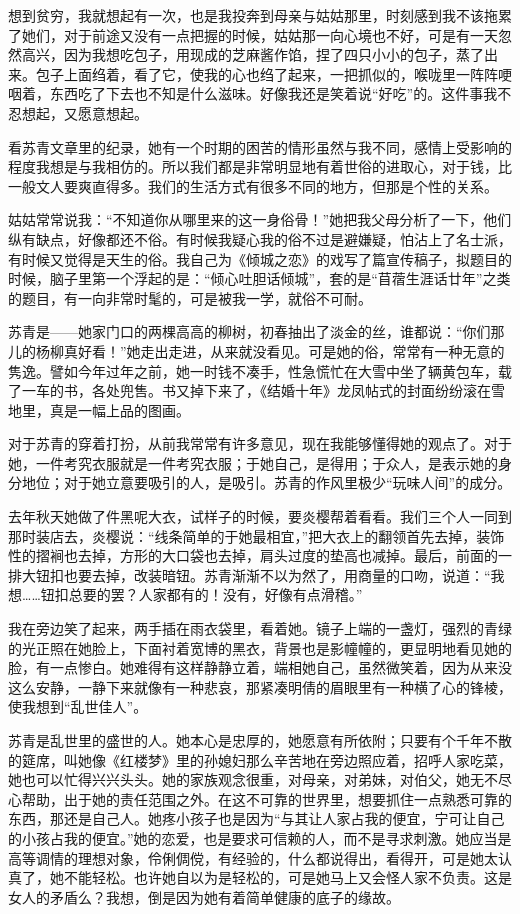 \par 想到贫穷，我就想起有一次，也是我投奔到母亲与姑姑那里，时刻感到我不该拖累了她们，对于前途又没有一点把握的时候，姑姑那一向心境也不好，可是有一天忽然高兴，因为我想吃包子，用现成的芝麻酱作馅，捏了四只小小的包子，蒸了出来。包子上面绉着，看了它，使我的心也绉了起来，一把抓似的，喉咙里一阵阵哽咽着，东西吃了下去也不知是什么滋味。好像我还是笑着说“好吃”的。这件事我不忍想起，又愿意想起。
\par 看苏青文章里的纪录，她有一个时期的困苦的情形虽然与我不同，感情上受影响的程度我想是与我相仿的。所以我们都是非常明显地有着世俗的进取心，对于钱，比一般文人要爽直得多。我们的生活方式有很多不同的地方，但那是个性的关系。
\par 姑姑常常说我：“不知道你从哪里来的这一身俗骨！”她把我父母分析了一下，他们纵有缺点，好像都还不俗。有时候我疑心我的俗不过是避嫌疑，怕沾上了名士派，有时候又觉得是天生的俗。我自己为《倾城之恋》的戏写了篇宣传稿子，拟题目的时候，脑子里第一个浮起的是：“倾心吐胆话倾城”，套的是“苜蓿生涯话廿年”之类的题目，有一向非常时髦的，可是被我一学，就俗不可耐。
\par 苏青是——她家门口的两棵高高的柳树，初春抽出了淡金的丝，谁都说：“你们那儿的杨柳真好看！”她走出走进，从来就没看见。可是她的俗，常常有一种无意的隽逸。譬如今年过年之前，她一时钱不凑手，性急慌忙在大雪中坐了辆黄包车，载了一车的书，各处兜售。书又掉下来了，《结婚十年》龙凤帖式的封面纷纷滚在雪地里，真是一幅上品的图画。
\par 对于苏青的穿着打扮，从前我常常有许多意见，现在我能够懂得她的观点了。对于她，一件考究衣服就是一件考究衣服；于她自己，是得用；于众人，是表示她的身分地位；对于她立意要吸引的人，是吸引。苏青的作风里极少“玩味人间”的成分。
\par 去年秋天她做了件黑呢大衣，试样子的时候，要炎樱帮着看看。我们三个人一同到那时装店去，炎樱说：“线条简单的于她最相宜，”把大衣上的翻领首先去掉，装饰性的摺裥也去掉，方形的大口袋也去掉，肩头过度的垫高也减掉。最后，前面的一排大钮扣也要去掉，改装暗钮。苏青渐渐不以为然了，用商量的口吻，说道：“我想……钮扣总要的罢？人家都有的！没有，好像有点滑稽。”
\par 我在旁边笑了起来，两手插在雨衣袋里，看着她。镜子上端的一盏灯，强烈的青绿的光正照在她脸上，下面衬着宽博的黑衣，背景也是影幢幢的，更显明地看见她的脸，有一点惨白。她难得有这样静静立着，端相她自己，虽然微笑着，因为从来没这么安静，一静下来就像有一种悲哀，那紧凑明倩的眉眼里有一种横了心的锋棱，使我想到“乱世佳人”。
\par 苏青是乱世里的盛世的人。她本心是忠厚的，她愿意有所依附；只要有个千年不散的筵席，叫她像《红楼梦》里的孙媳妇那么辛苦地在旁边照应着，招呼人家吃菜，她也可以忙得兴兴头头。她的家族观念很重，对母亲，对弟妹，对伯父，她无不尽心帮助，出于她的责任范围之外。在这不可靠的世界里，想要抓住一点熟悉可靠的东西，那还是自己人。她疼小孩子也是因为“与其让人家占我的便宜，宁可让自己的小孩占我的便宜。”她的恋爱，也是要求可信赖的人，而不是寻求刺激。她应当是高等调情的理想对象，伶俐倜傥，有经验的，什么都说得出，看得开，可是她太认真了，她不能轻松。也许她自以为是轻松的，可是她马上又会怪人家不负责。这是女人的矛盾么？我想，倒是因为她有着简单健康的底子的缘故。
